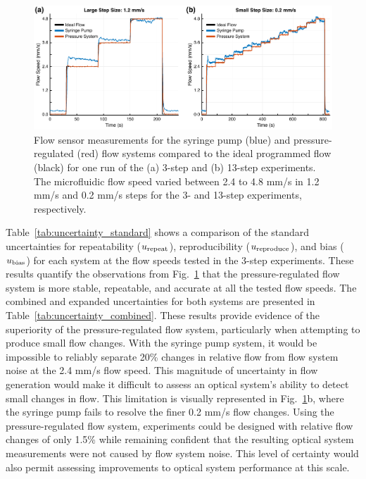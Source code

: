 \documentclass[12pt]{spieman}
\begin{document}
\begin{spacing}{2}
\begin{figure}
    \includegraphics[width=\textwidth]{Figure4.pdf}
    \caption {
        Flow sensor measurements for the syringe pump (blue) and pressure-regulated (red) flow systems compared to the ideal programmed flow (black) for one run of the (a) 3-step and (b) 13-step experiments. The microfluidic flow speed varied between 2.4 to 4.8 mm/s in 1.2 mm/s and 0.2 mm/s steps for the 3- and 13-step experiments, respectively.
    }
    \label{fig:SvP-FS}
\end{figure}

Table~\ref{tab:uncertainty_standard} shows a comparison of the standard uncertainties for repeatability ($u_\textnormal{repeat}$), reproducibility ($u_\textnormal{reproduce}$), and bias ($u_\textnormal{bias}$) for each system at the flow speeds tested in the 3-step experiments. These results quantify the observations from Fig.~\ref{fig:SvP-FS} that the pressure-regulated flow system is more stable, repeatable, and accurate at all the tested flow speeds. The combined and expanded uncertainties for both systems are presented in Table~\ref{tab:uncertainty_combined}. These results provide evidence of the superiority of the pressure-regulated flow system, particularly when attempting to produce small flow changes. With the syringe pump system, it would be impossible to reliably separate 20\% changes in relative flow from flow system noise at the 2.4 mm/s flow speed. This magnitude of uncertainty in flow generation would make it difficult to assess an optical system's ability to detect small changes in flow. This limitation is visually represented in Fig.~\ref{fig:SvP-FS}b, where the syringe pump fails to resolve the finer 0.2 mm/s flow changes. Using the pressure-regulated flow system, experiments could be designed with relative flow changes of only 1.5\% while remaining confident that the resulting optical system measurements were not caused by flow system noise. This level of certainty would also permit assessing improvements to optical system performance at this scale.


\end{spacing}
\end{document}
